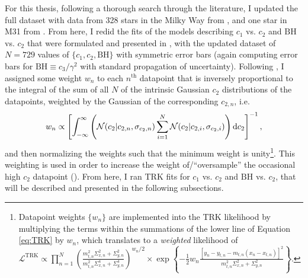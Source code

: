 For this thesis, following a thorough search through the literature, I updated the full dataset with data from 328 stars in the Milky Way from \textcite{newdatafitzpatrick2007analysis}, and one star in M31 from \textcite{m31dataclayton2015new}. %
From here, I redid the fits of the models describing $c_1$ vs. $c_2$ and $\text{BH}$ vs. $c_2$ that were formulated and presented in \textcite{trotter}, with the updated dataset of $N=729$ values of $\{c_1, c_2, \text{BH}\}$ with symmetric error bars (again computing error bars for $\text{BH}\equiv c_3/\gamma^2$ with standard propagation of uncertainty). Following \textcite{trotter}, I assigned some weight $w_n$ to each $n^\text{th}$ datapoint that is inversely proportional to the integral of the sum of all $N$ of the intrinsic Gaussian $c_2$ distributions of the datapoints, weighted by the Gaussian of the corresponding $c_{2,n}$, i.e.
\begin{equation}\label{eq:c2weight}
w_n\propto\left[\int_{-\infty}^\infty\left(\mathcal{N}(c_2|c_{2,n},\sigma_{c_2,n})\sum\limits_{i=1}^N\mathcal{N}(c_2|c_{2,i},\sigma_{c_2,i})\right)\mathop{}\!\mathrm{d} c_2\right]^{-1},
\end{equation}
and then normalizing the weights such that the minimum weight is unity\footnote{\label{footnote:weighting}Datapoint weights $\{w_n\}$ are implemented into the TRK likelihood by multiplying the terms within the summations of the lower line of Equation \eqref{eq:TRK} by $w_n$, which translates to a \textit{weighted} likelihood of 
$\displaystyle\mathcal{L}^{\mathrm {TRK}} \propto \prod_{n=1}^{N}{ \left(\frac{m_{t,n}^2\Sigma_{x,n}^2+\Sigma_{y,n}^2}{m_{t,n}^2\Sigma_{x,n}^4+\Sigma_{y,n}^4}\right)^{\displaystyle w_n/2}\times\exp\left\{{-\frac{1}{2}w_n\frac{\left[y_n-y_{t,n}-m_{t,n}(x_n-x_{t,n})\right]^2}{m_{t,n}^2\Sigma_{x,n}^2+\Sigma_{y,n}^2}}\right\}}$.}. This weighting is used in order to increase the weight of/``oversample'' the occasional high $c_2$ datapoint (\textcite{trotter}). From here, I ran TRK fits for $c_1$ vs. $c_2$ and $\text{BH}$ vs. $c_2$, that will be described and presented in the following subsections.

